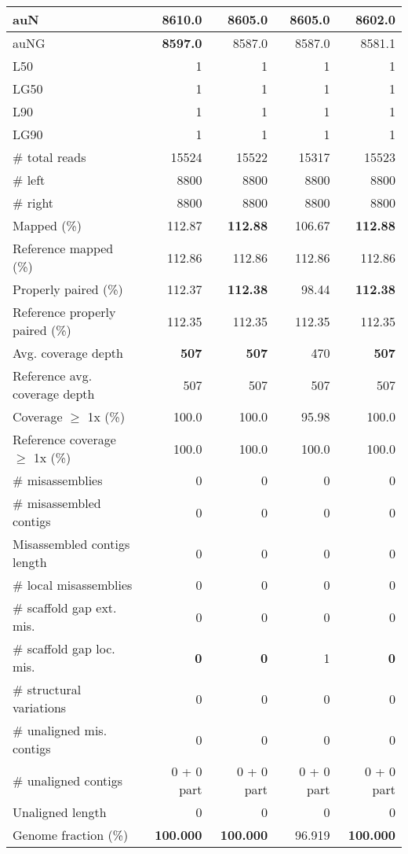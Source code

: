 \documentclass[12pt,a4paper]{article}
\begin{document}
\begin{table}[ht]
\begin{center}
\begin{tabular}{|l*{4}{|r}|}
auN & {\bf 8610.0} & 8605.0 & 8605.0 & 8602.0 \\ \hline
auNG & {\bf 8597.0} & 8587.0 & 8587.0 & 8581.1 \\ \hline
L50 & 1 & 1 & 1 & 1 \\ \hline
LG50 & 1 & 1 & 1 & 1 \\ \hline
L90 & 1 & 1 & 1 & 1 \\ \hline
LG90 & 1 & 1 & 1 & 1 \\ \hline
\# total reads & 15524 & 15522 & 15317 & 15523 \\ \hline
\# left & 8800 & 8800 & 8800 & 8800 \\ \hline
\# right & 8800 & 8800 & 8800 & 8800 \\ \hline
Mapped (\%) & 112.87 & {\bf 112.88} & 106.67 & {\bf 112.88} \\ \hline
Reference mapped (\%) & 112.86 & 112.86 & 112.86 & 112.86 \\ \hline
Properly paired (\%) & 112.37 & {\bf 112.38} & 98.44 & {\bf 112.38} \\ \hline
Reference properly paired (\%) & 112.35 & 112.35 & 112.35 & 112.35 \\ \hline
Avg. coverage depth & {\bf 507} & {\bf 507} & 470 & {\bf 507} \\ \hline
Reference avg. coverage depth & 507 & 507 & 507 & 507 \\ \hline
Coverage $\geq$ 1x (\%) & 100.0 & 100.0 & 95.98 & 100.0 \\ \hline
Reference coverage $\geq$ 1x (\%) & 100.0 & 100.0 & 100.0 & 100.0 \\ \hline
\# misassemblies & 0 & 0 & 0 & 0 \\ \hline
\# misassembled contigs & 0 & 0 & 0 & 0 \\ \hline
Misassembled contigs length & 0 & 0 & 0 & 0 \\ \hline
\# local misassemblies & 0 & 0 & 0 & 0 \\ \hline
\# scaffold gap ext. mis. & 0 & 0 & 0 & 0 \\ \hline
\# scaffold gap loc. mis. & {\bf 0} & {\bf 0} & 1 & {\bf 0} \\ \hline
\# structural variations & 0 & 0 & 0 & 0 \\ \hline
\# unaligned mis. contigs & 0 & 0 & 0 & 0 \\ \hline
\# unaligned contigs & 0 + 0 part & 0 + 0 part & 0 + 0 part & 0 + 0 part \\ \hline
Unaligned length & 0 & 0 & 0 & 0 \\ \hline
Genome fraction (\%) & {\bf 100.000} & {\bf 100.000} & 96.919 & {\bf 100.000} \\ \hline

\end{tabular}
\end{center}
\end{table}
\end{document}

